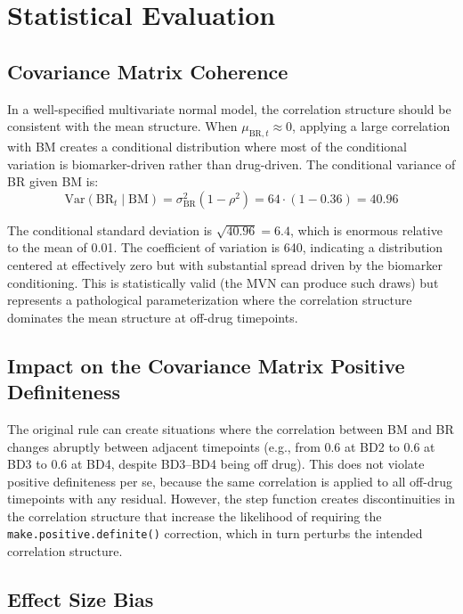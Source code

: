 \documentclass[11pt]{article}
\begin{document}
\section{Statistical Evaluation}

\subsection{Covariance Matrix Coherence}

In a well-specified multivariate normal model, the correlation
structure should be consistent with the mean structure. When
$\mu_{\text{BR},t} \approx 0$, applying a large correlation
with BM creates a conditional distribution where most of the
conditional variation is biomarker-driven rather than
drug-driven. The conditional variance of BR given BM is:
\[
\text{Var}(\text{BR}_t \mid \text{BM}) =
  \sigma_{\text{BR}}^2 (1 - \rho^2) =
  64 \cdot (1 - 0.36) = 40.96
\]

The conditional standard deviation is $\sqrt{40.96} = 6.4$,
which is enormous relative to the mean of 0.01. The
coefficient of variation is 640, indicating a distribution
centered at effectively zero but with substantial spread
driven by the biomarker conditioning. This is statistically
valid (the MVN can produce such draws) but represents a
pathological parameterization where the correlation structure
dominates the mean structure at off-drug timepoints.

\subsection{Impact on the Covariance Matrix Positive
            Definiteness}

The original rule can create situations where the correlation
between BM and BR changes abruptly between adjacent timepoints
(e.g., from 0.6 at BD2 to 0.6 at BD3 to 0.6 at BD4, despite
BD3--BD4 being off drug). This does not violate positive
definiteness per se, because the same correlation is applied
to all off-drug timepoints with any residual. However, the
step function creates discontinuities in the correlation
structure that increase the likelihood of requiring the
\texttt{make.positive.definite()} correction, which in turn
perturbs the intended correlation structure.

\subsection{Effect Size Bias}
\end{document}
